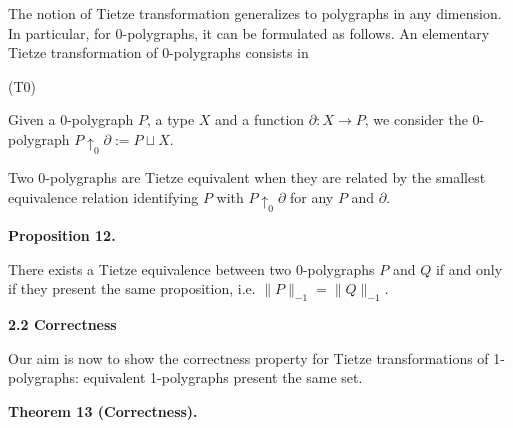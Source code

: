  
The notion of Tietze transformation generalizes to polygraphs in any dimension. In particular, for 0-polygraphs, it can be formulated as follows. An elementary Tietze transformation of 0-polygraphs consists in\par
  (T0)  
 
Given a 0-polygraph $P$, a type $X$ and a function $\partial:X\to P$, we consider the 0-polygraph $P{\uparrow_{0}}\partial:=P\sqcup X$.\par
 
   
Two 0-polygraphs are Tietze equivalent when they are related by the smallest equivalence relation identifying $P$ with $P{\uparrow_{0}}\partial$ for any $P$ and $\partial$.\par
 
 
 
\par\medskip\noindent\textbf{Proposition 12.}\par
 
 
There exists a Tietze equivalence between two 0-polygraphs $P$ and $Q$ if and only if they present the same proposition, i.e. $\|P\|_{-1}=\|Q\|_{-1}$.\par
 
 
 
 
 
 
\par\medskip\noindent\textbf{2.2 Correctness}\par
 
 
Our aim is now to show the correctness property for Tietze transformations of 1-polygraphs: equivalent 1-polygraphs present the same set.\par
 
 
 
\par\medskip\noindent\textbf{Theorem 13 (Correctness).}\par
 
